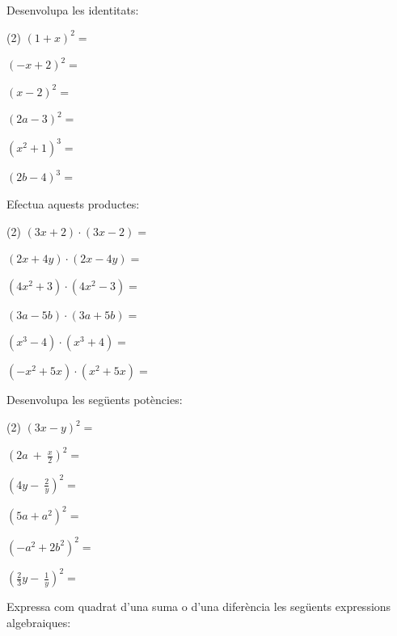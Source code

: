 \begin{mylist}

\exer \spen  Desenvolupa les identitats:

\begin{tasks}(2)
	\task  $(1+x)^{2}= $    
	
	\task  $(-x+2)^{2}= $     
	
	\task  $(x-2)^{2} =$ 
	
	\task  $(2a-3)^{2}= $      
	
	\task $\left(x^{2} +1\right)^{3}= $      
	
	\task $(2b-4)^{3}= $
\end{tasks}



\exer \spen  Efectua aquests productes:

\begin{tasks}(2)
	\task  $(3x+2)\cdot (3x-2)=$    

	\task  $(2x+4y)\cdot (2x-4y)=$   

	\task  $(4x^{2} +3)\cdot (4x^{2} -3)=$

	\task  $(3a-5b)\cdot (3a+5b)=$   
	
	\task  $(x^{3} -4)\cdot (x^{3} +4)=$ 

	\task  $\left(-x^{2} +5x\right)\cdot \left(x^{2} +5x \right)=$ 
\end{tasks}

\answers{[$9x^2-4$, $4x^2-16y^2$, $16x^4-9$, $9a^2-25b^2$, $x^6-16$, $-x^4+25x^2$]}

\exer \spen  Desenvolupa les següents potències: 

\begin{tasks}(2)
	\task  $(3x-y)^2=$
	
	\task  ${\left(2a\ +\ \frac{x}{2}\right)}^2=$   
	
	\task  ${\left(4y-\ \frac{2}{y}\right)}^2=$ 
	
	\task  $\left(5a+a^2\right)^2=$
	 
	\task  $\left( -a^2+2b^2 \right)^2=$ 
	 
	\task  ${\left(\frac{2}{3}y-\ \frac{1}{y}\right)}^2=$ 
\end{tasks}


\pagebreak
\exer \spen Expressa com quadrat d'una suma o d'una diferència les següents expressions algebraiques:


\end{mylist}
